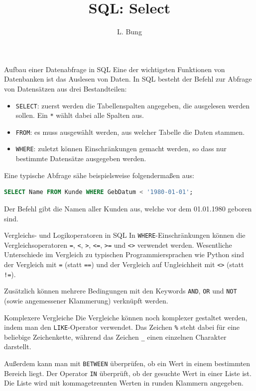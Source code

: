 \documentclass[11pt, a4paper, oneside]{article}
\begin{document}
	\author{L. Bung}
	\title{SQL: Select}
	\subject{SAE}
	\maketitle
	
	\begin{hint}{Aufbau einer Datenabfrage in SQL}
		Eine der wichtigsten Funktionen von Datenbanken ist das Auslesen von Daten.
		In SQL besteht der Befehl zur Abfrage von Datensätzen aus drei Bestandteilen:
		\begin{itemize}
			\item \texttt{SELECT}: zuerst werden die Tabellenspalten angegeben, die ausgelesen werden sollen. Ein \texttt{*} wählt dabei alle Spalten aus.
			\item \texttt{FROM}: es muss ausgewählt werden, aus welcher Tabelle die Daten stammen.
			\item \texttt{WHERE}: zuletzt können Einschränkungen gemacht werden, so dass nur bestimmte Datensätze ausgegeben werden.
		\end{itemize}
	\end{hint}
	
	Eine typische Abfrage sähe beispielsweise folgendermaßen aus:
	
	\begin{lstlisting}[language=sql]
SELECT Name FROM Kunde WHERE GebDatum < '1980-01-01';
	\end{lstlisting}
	
	Der Befehl gibt die Namen aller Kunden aus, welche vor dem 01.01.1980 geboren sind.
	
	\begin{warning}{Vergleichs- und Logikoperatoren in SQL}
		In \texttt{WHERE}-Einschränkungen können die Vergleichsoperatoren \texttt{=}, \texttt{<}, \texttt{>}, \texttt{<=}, \texttt{>=} und \texttt{<>} verwendet werden.
		Wesentliche Unterschiede im Vergleich zu typischen Programmiersprachen wie Python sind der Vergleich mit \texttt{=} (statt \texttt{==}) und der Vergleich auf Ungleichheit mit \texttt{<>} (statt \texttt{!=}).
		
		Zusätzlich können mehrere Bedingungen mit den Keywords \texttt{AND}, \texttt{OR} und \texttt{NOT} (sowie angemessener Klammerung) verknüpft werden.
	\end{warning}
	
	\begin{hint}{Komplexere Vergleiche}
		Die Vergleiche können noch komplexer gestaltet werden, indem man den \texttt{LIKE}-Operator verwendet.
		Das Zeichen \texttt{\%} steht dabei für eine beliebige Zeichenkette, während das Zeichen \texttt{\_} einen einzelnen Charakter darstellt.
		
		Außerdem kann man mit \texttt{BETWEEN} überprüfen, ob ein Wert in einem bestimmten Bereich liegt.
		Der Operator \texttt{IN} überprüft, ob der gesuchte Wert in einer Liste ist.
		Die Liste wird mit kommagetrennten Werten in runden Klammern angegeben.
	\end{hint}
	
\end{document}
